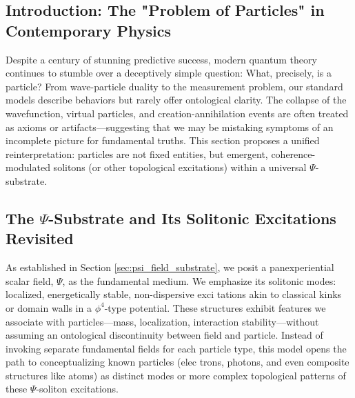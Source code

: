 \documentclass{report}
\begin{document}
    \subsection{Introduction: The "Problem of Particles" in Contemporary Physics}
    \label{subsec:problem_of_particles}
    Despite a century of stunning predictive success, modern quantum theory continues to stumble
    over a deceptively simple question: What, precisely, is a particle? From wave-particle duality to
    the measurement problem, our standard models describe behaviors but rarely offer ontological
    clarity. The collapse of the wavefunction, virtual particles, and creation-annihilation events
    are often treated as axioms or artifacts—suggesting that we may be mistaking symptoms of
    an incomplete picture for fundamental truths. This section proposes a unified reinterpretation:
    particles are not fixed entities, but emergent, coherence-modulated solitons (or other topological
    excitations) within a universal $\Psi$-substrate.

    \subsection{The $\Psi$-Substrate and Its Solitonic Excitations Revisited}
    \label{subsec:psi_substrate_solitons_revisited}
    As established in Section \ref{sec:psi_field_substrate}, we posit a panexperiential scalar field, $\Psi$, as the fundamental
    medium. We emphasize its solitonic modes: localized, energetically stable, non-dispersive exci tations akin to classical kinks or domain walls in a $\phi^4$-type potential. These structures exhibit
    features we associate with particles—mass, localization, interaction stability—without assuming
    an ontological discontinuity between field and particle. Instead of invoking separate fundamental
    fields for each particle type, this model opens the path to conceptualizing known particles (elec trons, photons, and even composite structures like atoms) as distinct modes or more complex
    topological patterns of these $\Psi$-soliton excitations.
\end{document}
